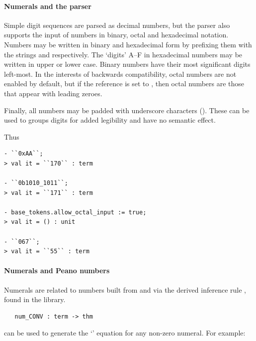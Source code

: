 \paragraph{Numerals and the parser}
%
%
Simple digit sequences are parsed as decimal numbers, but the parser
also supports the input of numbers in binary, octal and hexadecimal
notation.  Numbers may be written in binary and hexadecimal form by
prefixing them with the strings  and  respectively.  The
`digits' A--F in hexadecimal numbers may be written in upper or lower
case.  Binary numbers have their most significant digits left-most. In
the interests of backwards compatibility, octal numbers are not
enabled by default, but if the reference
 is set to , then octal
numbers are those that appear with leading zeroes.

Finally, all numbers may be padded with underscore characters
(\ml{\_}).  These can be used to groups digits for added legibility
and have no semantic effect.

Thus
\begin{session}
\begin{verbatim}
- ``0xAA``;
> val it = ``170`` : term

- ``0b1010_1011``;
> val it = ``171`` : term

- base_tokens.allow_octal_input := true;
> val it = () : unit

- ``067``;
> val it = ``55`` : term
\end{verbatim}
\end{session}

\paragraph{Numerals and Peano numbers}

Numerals are related to numbers built from  and 
via the derived inference rule , found in the
 library.

\begin{boxed}
\begin{verbatim}
   num_CONV : term -> thm
\end{verbatim}
\end{boxed}

\noindent {} can be used to generate the `'
equation for any non-zero numeral.  For example:

